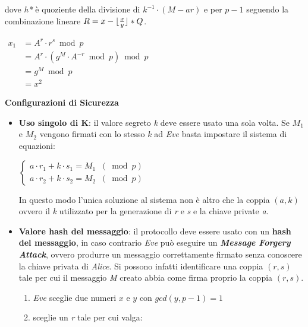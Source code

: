 dove \textit{h*} è quoziente della divisione di $k^{-1} \cdot (M - ar)$ e per $p - 1$ seguendo la combinazione lineare $R = x - \lfloor\frac{x}{y}\rfloor * Q$.
\begin{center}
    \begin{math}
        \begin{aligned}    
            x_1 &= A^r \cdot r^s \bmod p \\
            &= A^r \cdot (g^M \cdot A^{-r} \bmod p) \bmod p \\
            &= g^M \bmod p \\
            &= x^2
        \end{aligned}
    \end{math}
\end{center}
\textbf{Configurazioni di Sicurezza}
\begin{itemize}
    \item \textbf{Uso singolo di K}: il valore segreto \textit{k} deve essere usato una sola volta. Se $M_1$ e $M_2$ vengono firmati con lo stesso \textit{k} ad \textit{Eve} basta impostare il sistema di equazioni:
    \begin{center}
        \begin{math}
            \begin{cases}
                a \cdot r_1 + k \cdot s_1 = M_1\;\;(\bmod p) \\
                a \cdot r_2 + k \cdot s_2 = M_2\;\;(\bmod p)
            \end{cases}
        \end{math}
    \end{center}
    In questo modo l'unica soluzione al sistema non è altro che la coppia $(a, k)$ ovvero il \textit{k} utilizzato per la generazione di \textit{r} e \textit{s} e la chiave private \textit{a}.
    \item \textbf{Valore hash del messaggio}: il protocollo deve essere usato con un \textbf{hash del messaggio}, in caso contrario \textit{Eve} può eseguire un \textbf{\textit{Message Forgery Attack}}, ovvero produrre un messaggio correttamente firmato senza conoscere la chiave privata di \textit{Alice}. Si possono infatti identificare una coppia $(r, s)$ tale per cui il messaggio \textit{M} creato abbia come firma proprio la coppia $(r, s)$.
    \begin{enumerate}
        \item \textit{Eve} sceglie due numeri $x \text{ e } y$ con $gcd(y, p - 1) = 1$
        \item sceglie un \textit{r} tale per cui valga:

\end{enumerate}
\end{itemize}
